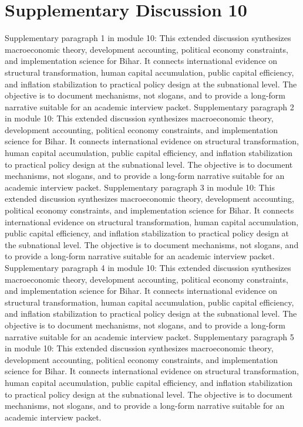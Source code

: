 \documentclass[preprint,12pt]{elsarticle}
\begin{document}
\section{Supplementary Discussion 10}
Supplementary paragraph 1 in module 10: This extended discussion synthesizes macroeconomic theory, development accounting, political economy constraints, and implementation science for Bihar. It connects international evidence on structural transformation, human capital accumulation, public capital efficiency, and inflation stabilization to practical policy design at the subnational level. The objective is to document mechanisms, not slogans, and to provide a long-form narrative suitable for an academic interview packet.
Supplementary paragraph 2 in module 10: This extended discussion synthesizes macroeconomic theory, development accounting, political economy constraints, and implementation science for Bihar. It connects international evidence on structural transformation, human capital accumulation, public capital efficiency, and inflation stabilization to practical policy design at the subnational level. The objective is to document mechanisms, not slogans, and to provide a long-form narrative suitable for an academic interview packet.
Supplementary paragraph 3 in module 10: This extended discussion synthesizes macroeconomic theory, development accounting, political economy constraints, and implementation science for Bihar. It connects international evidence on structural transformation, human capital accumulation, public capital efficiency, and inflation stabilization to practical policy design at the subnational level. The objective is to document mechanisms, not slogans, and to provide a long-form narrative suitable for an academic interview packet.
Supplementary paragraph 4 in module 10: This extended discussion synthesizes macroeconomic theory, development accounting, political economy constraints, and implementation science for Bihar. It connects international evidence on structural transformation, human capital accumulation, public capital efficiency, and inflation stabilization to practical policy design at the subnational level. The objective is to document mechanisms, not slogans, and to provide a long-form narrative suitable for an academic interview packet.
Supplementary paragraph 5 in module 10: This extended discussion synthesizes macroeconomic theory, development accounting, political economy constraints, and implementation science for Bihar. It connects international evidence on structural transformation, human capital accumulation, public capital efficiency, and inflation stabilization to practical policy design at the subnational level. The objective is to document mechanisms, not slogans, and to provide a long-form narrative suitable for an academic interview packet.
\end{document}
